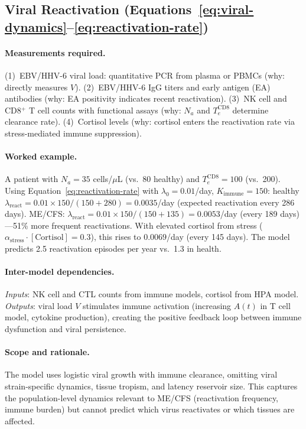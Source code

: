 \subsection{Viral Reactivation (Equations~\ref{eq:viral-dynamics}--\ref{eq:reactivation-rate})}

\paragraph{Measurements required.}
(1)~EBV/HHV-6 viral load: quantitative PCR from plasma or PBMCs (why: directly measures $V$).
(2)~EBV/HHV-6 IgG titers and early antigen (EA) antibodies (why: EA positivity indicates recent reactivation).
(3)~NK cell and CD8$^+$ T cell counts with functional assays (why: $N_a$ and $T_e^{\text{CD8}}$ determine clearance rate).
(4)~Cortisol levels (why: cortisol enters the reactivation rate via stress-mediated immune suppression).

\paragraph{Worked example.}
A patient with $N_a = 35$ cells/$\mu$L (vs.\ 80 healthy) and $T_e^{\text{CD8}} = 100$ (vs.\ 200). Using Equation~\ref{eq:reactivation-rate} with $\lambda_0 = 0.01$/day, $K_{\text{immune}} = 150$: healthy $\lambda_{\text{react}} = 0.01 \times 150/(150 + 280) = 0.0035$/day (expected reactivation every 286 days). ME/CFS: $\lambda_{\text{react}} = 0.01 \times 150/(150 + 135) = 0.0053$/day (every 189 days)---51\% more frequent reactivations. With elevated cortisol from stress ($\alpha_{\text{stress}} \cdot [\text{Cortisol}] = 0.3$), this rises to $0.0069$/day (every 145 days). The model predicts 2.5 reactivation episodes per year vs.\ 1.3 in health.

\paragraph{Inter-model dependencies.}
\emph{Inputs}: NK cell and CTL counts from immune models, cortisol from HPA model. \emph{Outputs}: viral load $V$ stimulates immune activation (increasing $A(t)$ in T cell model, cytokine production), creating the positive feedback loop between immune dysfunction and viral persistence.

\paragraph{Scope and rationale.}
The model uses logistic viral growth with immune clearance, omitting viral strain-specific dynamics, tissue tropism, and latency reservoir size. This captures the population-level dynamics relevant to ME/CFS (reactivation frequency, immune burden) but cannot predict which virus reactivates or which tissues are affected.

